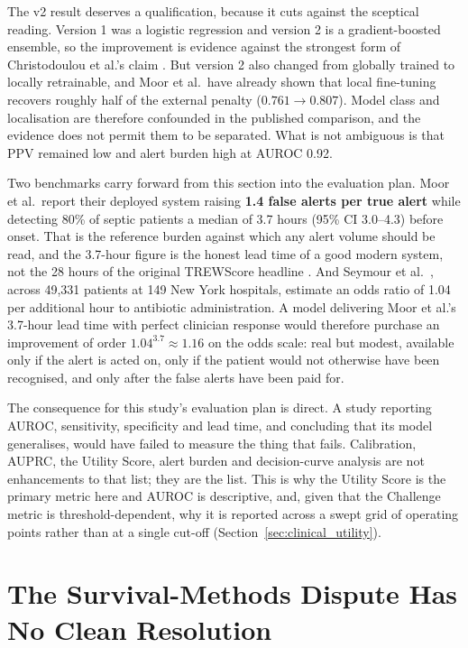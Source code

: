 The v2 result deserves a qualification, because it cuts against the sceptical
reading. Version 1 was a logistic regression and version 2 is a gradient-boosted
ensemble, so the improvement is evidence against the strongest form of
Christodoulou et al.'s claim \cite{christodoulou2019cox}. But version 2 also
changed from globally trained to locally retrainable, and Moor et al.\ have
already shown that local fine-tuning recovers roughly half of the external
penalty ($0.761 \rightarrow 0.807$). Model class and localisation are therefore
confounded in the published comparison, and the evidence does not permit them to
be separated. What is not ambiguous is that PPV remained low and alert burden
high at AUROC 0.92.

Two benchmarks carry forward from this section into the evaluation plan. Moor
et al.\ report their deployed system raising \textbf{1.4 false alerts per true
alert} while detecting 80\% of septic patients a median of 3.7 hours (95\% CI
3.0--4.3) before onset. That is the reference burden against which any alert
volume should be read, and the 3.7-hour figure is the honest lead time of a
good modern system, not the 28 hours of the original TREWScore headline
\cite{henry2015trewscore}. And Seymour et al.\ \cite{seymour2017time}, across
49,331 patients at 149 New York hospitals, estimate an odds ratio of 1.04 per
additional hour to antibiotic administration. A model delivering Moor et al.'s
3.7-hour lead time with perfect clinician response would therefore purchase an
improvement of order $1.04^{3.7} \approx 1.16$ on the odds scale: real but
modest, available only if the alert is acted on, only if the patient would not
otherwise have been recognised, and only after the false alerts have been paid
for.

The consequence for this study's evaluation plan is direct. A study reporting
AUROC, sensitivity, specificity and lead time, and concluding that its model
generalises, would have failed to measure the thing that fails. Calibration,
AUPRC, the Utility Score, alert burden and decision-curve analysis are not
enhancements to that list; they are the list. This is why the Utility Score is
the primary metric here and AUROC is descriptive, and, given that the
Challenge metric is threshold-dependent, why it is reported across a swept grid
of operating points rather than at a single cut-off
(Section~\ref{sec:clinical_utility}).


\section{The Survival-Methods Dispute Has No Clean Resolution}
\label{sec:survival_dispute}

